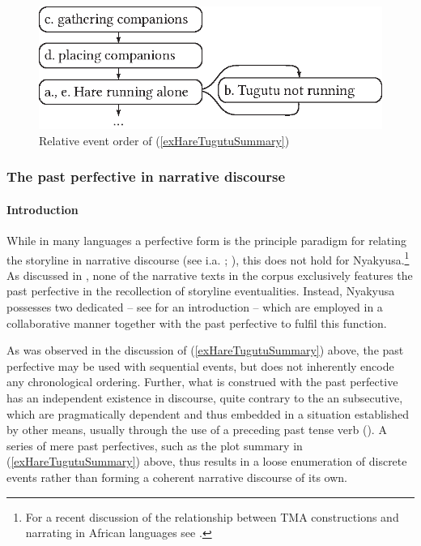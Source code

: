 \begin{figure}[hbt]
\begin{center}
\includegraphics{figures/GrafikRelativeOrderHareTugutuPFV.eps}
\caption{Relative event order of (\ref{exHareTugutuSummary})}
\label{FigureRelativeOrderHareTugutuSummary}
\end{center}
\end{figure}
 
\subsubsection{The past perfective in narrative discourse}
\label{PastPerfectiveNarrative}
\paragraph{Introduction}
While in many languages a perfective form is the principle paradigm for relating the storyline in narrative discourse (see i.a. \citealt{HopperP1979}; \citealt{FleischmanS1990}), this does not hold for Nyakyusa.\footnote{For a recent discussion of the relationship between TMA constructions and narrating in African languages see \citet{PayneDLShirtzS2015}.} As discussed in , none of the narrative texts in the corpus exclusively features the past perfective  in the recollection of storyline eventualities. Instead, Nyakyusa possesses two dedicated  -- see  for an introduction -- which are employed in a collaborative manner together with the past perfective to fulfil this function. 

As was observed in the discussion of (\ref{exHareTugutuSummary}) above, the past perfective may be used with sequential events, but does not inherently encode any chronological ordering. Further, what is construed with the past perfective has an independent existence in discourse, quite contrary to the  an subsecutive, which are pragmatically dependent and thus embedded in a situation established by other means, usually through the use of a preceding past tense verb (). A series of mere past perfectives, such as the plot summary in (\ref{exHareTugutuSummary}) above, thus results in a loose enumeration of discrete events rather than forming a coherent narrative discourse of its own.

